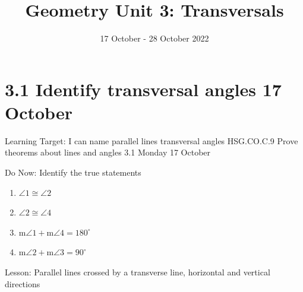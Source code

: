 

\newcommand\ticks{}
  \def\ticks{{Bar[scale=2]}-{Bar[scale=2]}}
\newcommand\paraticks{}
  \def\paraticks{{Straight Barb[reversed, scale=2]}-{Straight Barb[scale=2]}}

\title{Geometry Unit 3: Transversals}
\date{17 October - 28 October 2022}


\frame{\titlepage}
\section[Outline]{}
\frame{\tableofcontents}

\section{3.1 Identify transversal angles \hfill 17 October \,}
\begin{frame}{Learning Target: I can name parallel lines transversal angles}
  {HSG.CO.C.9 Prove theorems about lines and angles  \hfill \alert{3.1 Monday 17 October}}
  \begin{block}{Do Now: Identify the true statements}
    \begin{multicols}{2}
    \begin{enumerate}
      \item $\angle 1 \cong \angle 2$
      \item $\angle 2 \cong \angle 4$
      \item m$\angle 1 + \text{m}\angle 4=180^\circ$
      \item m$\angle 2 + \text{m}\angle 3=90^\circ$
    \end{enumerate}
    \begin{center}
    \end{center}
  \end{multicols}
  \end{block}
    Lesson: Parallel lines crossed by a transverse line, horizontal and vertical directions
\end{frame}

